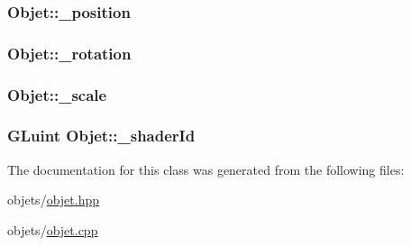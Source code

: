 \hypertarget{class_objet_a6c1a10fa5f4c5cd0e0617d93f42d927b}{
\subsubsection[{\+\_\+position}]{ Objet\+::\+\_\+position\hspace{0.3cm}{\ttfamily [protected]}}}\label{class_objet_a6c1a10fa5f4c5cd0e0617d93f42d927b}
\hypertarget{class_objet_a1d8675e88cc98ba740292af1421c2ee1}{
\subsubsection[{\+\_\+rotation}]{ Objet\+::\+\_\+rotation\hspace{0.3cm}{\ttfamily [protected]}}}\label{class_objet_a1d8675e88cc98ba740292af1421c2ee1}
\hypertarget{class_objet_a3fee0c5016edddf7c4b9a0b55ef44752}{
\subsubsection[{\+\_\+scale}]{ Objet\+::\+\_\+scale\hspace{0.3cm}{\ttfamily [protected]}}}\label{class_objet_a3fee0c5016edddf7c4b9a0b55ef44752}
\hypertarget{class_objet_af0d545a506dbfa377c8ca5a499fdf755}{
\subsubsection[{\+\_\+shader\+Id}]{\setlength{\rightskip}{0pt plus 5cm}G\+Luint Objet\+::\+\_\+shader\+Id\hspace{0.3cm}{\ttfamily [protected]}}}\label{class_objet_af0d545a506dbfa377c8ca5a499fdf755}


The documentation for this class was generated from the following files\+:\begin{DoxyCompactItemize}
\item 
objets/\hyperlink{objet_8hpp}{objet.\+hpp}\item 
objets/\hyperlink{objet_8cpp}{objet.\+cpp}\end{DoxyCompactItemize}
